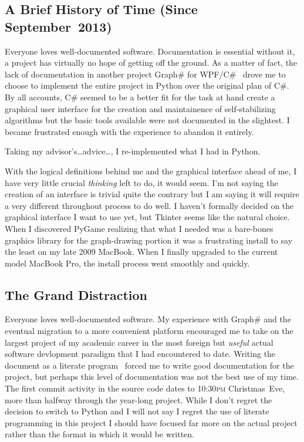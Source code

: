 \subsection{A Brief History of Time (Since September~2013)}
Everyone loves well-documented software.
Documentation is essential \Dash without it, a project has virtually no hope of getting off the ground.
As a matter of fact, the lack of documentation in another project \Dash
  Graph\# for WPF/C\#~\autocite{palesz:graphsharp} \Dash
  drove me to choose to implement the entire project in Python over the original plan of C\#.
By all accounts, C\# seemed to be a better fit for the task at hand \Dash
  create a graphical user interface for the creation and maintainence of self-stabilizing algorithms \Dash
  but the basic tools available were not documented in the slightest.
I became frustrated enough with the experience to abandon it entirely.

Taking my advisor's\dots advice\dots, I re-implemented what I had in Python.

\bigskip

With the logical definitions behind me and the graphical interface ahead of me,
  I have very little crucial \emph{thinking} left to do, it would seem.
I'm not saying the creation of an interface is trivial \Dash quite the contrary \Dash
  but I am saying it will require a very different throughout process to do well.
I haven't formally decided on the graphical interface I want to use yet, but Tkinter seems like the natural choice.
When I discovered PyGame \Dash realizing that what I needed was
  a bare-bones graphics library for the graph-drawing portion \Dash
  it was a frustrating install to say the least on my late 2009 MacBook.
When I finally upgraded to the current model MacBook Pro,
  the install process went smoothly and quickly.

\subsection{The Grand Distraction}
Everyone loves well-documented software.
My experience with Graph\# \Dash and the eventual migration to a more convenient platform \Dash
  encouraged me to take on the largest project of my academic career in
  the most foreign \Dash but \emph{useful} \Dash actual software devlopment paradigm
  that I had encountered to date.
Writing the document as a literate program~\autocite{knuth:lit-prog}
  forced me to write good documentation for the project,
  but perhaps this level of documentation was not the best use of my time.
The first commit activity in the source code dates to 10:30\textsc{pm} Christmas~Eve,
  more than halfway through the year-long project.
While I don't regret the decision to switch to Python \Dash
  and I will not say I regret the use of literate programming in this project \Dash
  I should have focused far more on the actual project
  rather than the format in which it would be written.


